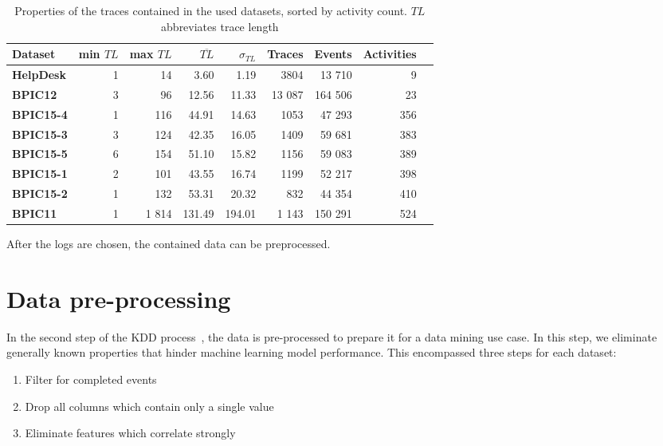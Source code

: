 \begin{table}
  \centering
  \begin{adjustbox}{center}
  \begin{tabular}{lrrrrrrrr}
  \textbf{Dataset} & \textbf{min $TL$} & \textbf{max $TL$} & \textbf{$\overline{TL}$} & \textbf{$\sigma_{TL}$} & \textbf{Traces} & \textbf{Events} & \textbf{Activities} \\
  \midrule
  \textbf{HelpDesk} & 1 & 14  & 3.60  & 1.19  & 3804   &  13 710 & 9\\
  \textbf{BPIC12}   & 3 & 96  & 12.56 & 11.33 & 13 087 & 164 506 & 23\\
  \textbf{BPIC15-4} & 1 & 116 & 44.91 & 14.63 & 1053 & 47 293 & 356\\
  \textbf{BPIC15-3} & 3 & 124 & 42.35 & 16.05 & 1409 & 59 681 & 383\\
  \textbf{BPIC15-5} & 6 & 154 & 51.10 & 15.82 & 1156 & 59 083 & 389\\
  \textbf{BPIC15-1} & 2 & 101 & 43.55 & 16.74 & 1199 & 52 217 & 398\\
  \textbf{BPIC15-2} & 1 & 132 & 53.31 & 20.32 & 832 & 44 354 & 410\\
  \textbf{BPIC11}  & 1 & 1 814& 131.49&194.01 & 1 143 & 150 291 & 524
  \end{tabular}
  \end{adjustbox}
  \caption[Trace properties in each dataset]{Properties of the traces contained in the used datasets, sorted by activity count. $TL$ abbreviates trace length}
  \label{tab:dataset-characteristics}
\end{table}

After the logs are chosen, the contained data can be preprocessed.

\section{Data pre-processing}\label{sec:method:data-preprocessing}
In the second step of the KDD process~\cite{fayyad1996data}, the data is pre-processed to prepare it for a data mining use case. In this step, we eliminate generally known properties that hinder machine learning model performance. This encompassed three steps for each dataset:

\begin{enumerate}
    \item Filter for completed events
    \item Drop all columns which contain only a single value
    \item Eliminate features which correlate strongly
\end{enumerate}

